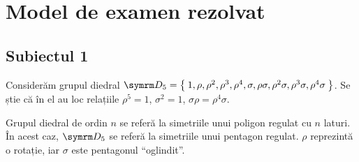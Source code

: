 \section*{Model de examen rezolvat}

\subsection*{Subiectul 1}

Considerăm grupul diedral \(\dihedralgroup_5 = \Set{ 1, \rho, \rho^2, \rho^3, \rho^4, \sigma, \rho \sigma, \rho^2 \sigma, \rho^3 \sigma, \rho^4 \sigma }\).
Se știe că în el au loc relațiile \(\rho^5 = 1\), \(\sigma^2 = 1\), \(\sigma \rho = \rho^4 \sigma\).

Grupul diedral de ordin \(n\) se referă la simetriile unui poligon regulat cu \(n\) laturi. În acest caz, \(\dihedralgroup_5\) se referă la simetriile unui pentagon regulat. \(\rho\) reprezintă o rotație, iar \(\sigma\) este pentagonul ``oglindit''.

